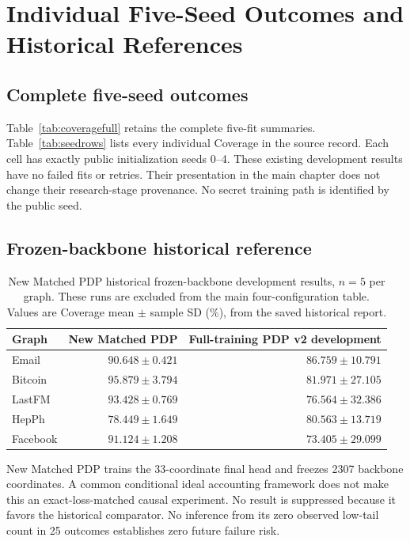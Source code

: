 \chapter{Individual Five-Seed Outcomes and Historical References}\label{app:development}
\section{Complete five-seed outcomes}
Table~\ref{tab:coveragefull} retains the complete five-fit summaries. Table~\ref{tab:seedrows} lists every individual Coverage in the source record. Each cell has exactly public initialization seeds 0--4. These existing development results have no failed fits or retries. Their presentation in the main chapter does not change their research-stage provenance. No secret training path is identified by the public seed.



\clearpage
\section{Frozen-backbone historical reference}
\begin{table}[htbp]
\centering\small
\caption{New Matched PDP historical frozen-backbone development results, $n=5$ per graph. These runs are excluded from the main four-configuration table. Values are Coverage mean $\pm$ sample SD (\%), from the saved historical report.}\label{tab:newmatched}
\begin{tabular}{lrr}\toprule
Graph & New Matched PDP & Full-training PDP v2 development\\\midrule
Email & $90.648\pm0.421$ & $86.759\pm10.791$\\
Bitcoin & $95.879\pm3.794$ & $81.971\pm27.105$\\
LastFM & $93.428\pm0.769$ & $76.564\pm32.386$\\
HepPh & $78.449\pm1.649$ & $80.563\pm13.719$\\
Facebook & $91.124\pm1.208$ & $73.405\pm29.099$\\\bottomrule
\end{tabular}
\end{table}

New Matched PDP trains the 33-coordinate final head and freezes 2307 backbone coordinates. A common conditional ideal accounting framework does not make this an exact-loss-matched causal experiment. No result is suppressed because it favors the historical comparator. No inference from its zero observed low-tail count in 25 outcomes establishes zero future failure risk.

